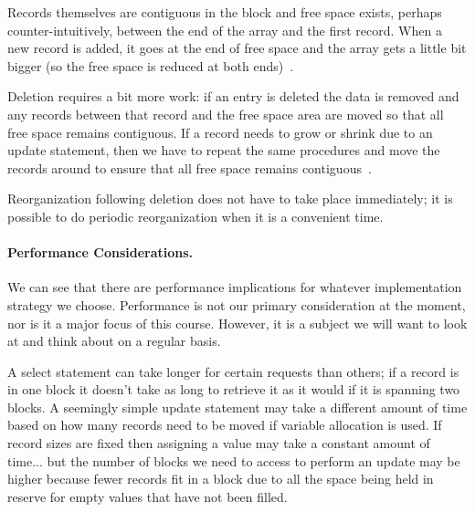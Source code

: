 Records themselves are contiguous in the block and free space exists, perhaps counter-intuitively, between the end of the array and the first record. When a new record is added, it goes at the end of free space and the array gets a little bit bigger (so the free space is reduced at both ends)~\cite{dsc}. 

Deletion requires a bit more work: if an entry is deleted the data is removed and any records between that record and the free space area are moved so that all free space remains contiguous. If a record needs to grow or shrink due to an update statement, then we have to repeat the same procedures and move the records around to ensure that all free space remains contiguous~\cite{dsc}. 

Reorganization following deletion does not have to take place immediately; it is possible to do periodic reorganization when it is a convenient time.

\paragraph{Performance Considerations.}

We can see that there are performance implications for whatever implementation strategy we choose. Performance is not our primary consideration at the moment, nor is it a major focus of this course. However, it is a subject we will want to look at and think about on a regular basis. 

 A select statement can take longer for certain requests than others; if a record is in one block it doesn't take as long to retrieve it as it would if it is spanning two blocks. A seemingly simple update statement may take a different amount of time based on how many records need to be moved if variable allocation is used. If record sizes are fixed then assigning a value may take a constant amount of time... but the number of blocks we need to access to perform an update may be higher because fewer records fit in a block due to all the space being held in reserve for empty values that have not been filled.







